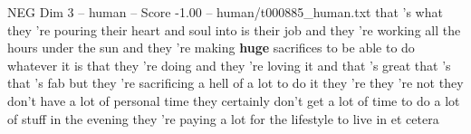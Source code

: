 \begin{textsample}{NEG Dim 3 – human – Score -1.00 – human/t000885\_human.txt}  \label{ex:f3_neg_036}
that 's what they 're pouring their heart and soul into is their job and they 're working all the hours under the sun and they 're making \textbf{huge} sacrifices to be able to do whatever it is that they 're doing and they 're loving it and that 's great that 's that 's fab but they 're sacrificing a hell of a lot to do it they 're they 're not they don't have a lot of personal time they certainly don't get a lot of time to do a lot of stuff in the evening they 're paying a lot for the lifestyle to live in et cetera

\end{textsample}
